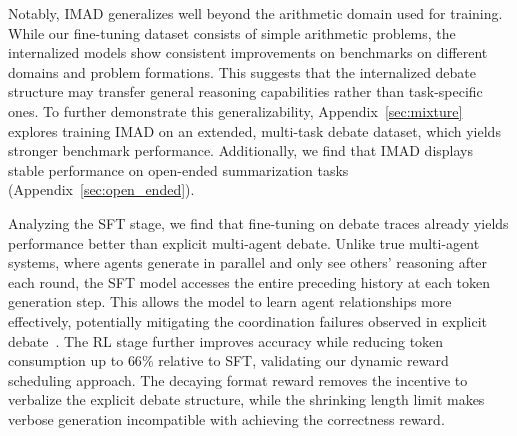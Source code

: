 \documentclass[11pt]{article}
\begin{document}
Notably, IMAD generalizes well beyond the arithmetic domain used for training. While our fine-tuning dataset consists of simple arithmetic problems, the internalized models show consistent improvements on benchmarks on different domains and problem formations.
This suggests that the internalized debate structure may transfer general reasoning capabilities rather than task-specific ones.
To further demonstrate this generalizability, Appendix~\ref{sec:mixture} explores training IMAD on an extended, multi-task debate dataset, which yields stronger benchmark performance. Additionally, we find that IMAD displays stable performance on open-ended summarization tasks (Appendix~\ref{sec:open_ended}).

Analyzing the SFT stage, we find that fine-tuning on debate traces already yields performance better than explicit multi-agent debate.
Unlike true multi-agent systems, where agents generate in parallel and only see others' reasoning after each round, the SFT model accesses the entire preceding history at each token generation step. This allows the model to learn agent relationships more effectively, potentially mitigating the coordination failures observed in explicit debate~\cite{pan2025multiagent}.
The RL stage further improves accuracy while reducing token consumption up to $66\%$ relative to SFT, validating our dynamic reward scheduling approach. 
The decaying format reward removes the incentive to verbalize the explicit debate structure, while the shrinking length limit makes verbose generation incompatible with achieving the correctness reward. 
\end{document}
